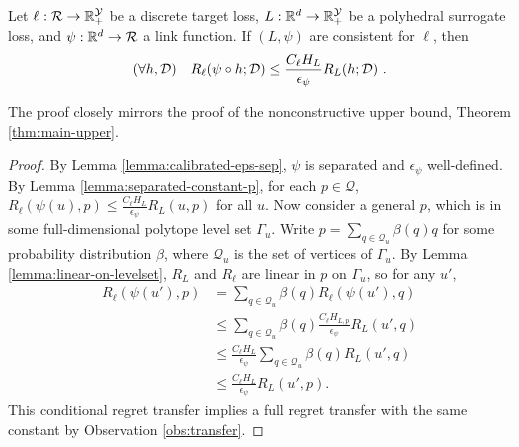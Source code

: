 \begin{theorem*}
  Let $\ell: \mathcal{R} \to \mathbb{R}_+^{\mathcal{Y}}$ be a discrete target loss, $L: \mathbb{R}^d \to \mathbb{R}_+^{\mathcal{Y}}$ be a polyhedral surrogate loss, and $\psi: \mathbb{R}^d \to \mathcal{R}$ a link function.
  If $(L,\psi)$ are consistent for $\ell$, then
    \[ (\forall h,\mathcal{D}) \quad R_{\ell}(\psi \circ h ; \mathcal{D}) \leq \frac{C_{\ell} H_L}{\epsilon_{\psi}} R_L(h ; \mathcal{D}) ~. \]
\end{theorem*}
The proof closely mirrors the proof of the nonconstructive upper bound, Theorem \ref{thm:main-upper}.
\begin{proof}
  By Lemma \ref{lemma:calibrated-eps-sep}, $\psi$ is separated and $\epsilon_{\psi}$ well-defined.
  By Lemma \ref{lemma:separated-constant-p}, for each $p \in \mathcal{Q}$, $R_{\ell}(\psi(u),p) \leq \frac{C_{\ell} H_L}{\epsilon_{\psi}} R_L(u,p)$ for all $u$.
  Now consider a general $p$, which is in some full-dimensional polytope level set $\Gamma_u$.
  Write $p = \sum_{q \in \mathcal{Q}_u} \beta(q) q$ for some probability distribution $\beta$, where $\mathcal{Q}_u$ is the set of vertices of $\Gamma_u$.
  By Lemma \ref{lemma:linear-on-levelset}, $R_L$ and $R_{\ell}$ are linear in $p$ on $\Gamma_u$, so for any $u'$,
  \begin{align*}
    R_{\ell}(\psi(u'),p)
    &=    \sum_{q \in \mathcal{Q}_u} \beta(q) R_{\ell}(\psi(u'), q)  \\
    &\leq \sum_{q \in \mathcal{Q}_u} \beta(q) \frac{C_{\ell} H_{L,p}}{\epsilon_{\psi}} R_L(u', q)  \\
    &\leq \frac{C_{\ell} H_L}{\epsilon_{\psi}} \sum_{q \in \mathcal{Q}_u} \beta(q) R_L(u', q)  \\
    &\leq \frac{C_{\ell} H_L}{\epsilon_{\psi}} R_L(u', p) .
  \end{align*}
  This conditional regret transfer implies a full regret transfer with the same constant by Observation \ref{obs:transfer}.
\end{proof}





%
%
%
%
%
%
%


